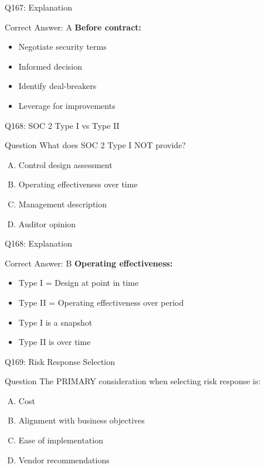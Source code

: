 \documentclass{beamer}
\begin{document}
	\begin{frame}{Q167: Explanation}
		\begin{block}{Correct Answer: A}
			\textbf{Before contract:}
			\begin{itemize}
				\item Negotiate security terms
				\item Informed decision
				\item Identify deal-breakers
				\item Leverage for improvements
			\end{itemize}
		\end{block}
	\end{frame}
	
	\begin{frame}{Q168: SOC 2 Type I vs Type II}
		\begin{block}{Question}
			What does SOC 2 Type I NOT provide?
		\end{block}
		\begin{enumerate}[(A)]
			\item Control design assessment
			\item Operating effectiveness over time
			\item Management description
			\item Auditor opinion
		\end{enumerate}
	\end{frame}
	
	\begin{frame}{Q168: Explanation}
		\begin{block}{Correct Answer: B}
			\textbf{Operating effectiveness:}
			\begin{itemize}
				\item Type I = Design at point in time
				\item Type II = Operating effectiveness over period
				\item Type I is a snapshot
				\item Type II is over time
			\end{itemize}
		\end{block}
	\end{frame}
	
	\begin{frame}{Q169: Risk Response Selection}
		\begin{block}{Question}
			The PRIMARY consideration when selecting risk response is:
		\end{block}
		\begin{enumerate}[(A)]
			\item Cost
			\item Alignment with business objectives
			\item Ease of implementation
			\item Vendor recommendations
		\end{enumerate}
	\end{frame}
	
\end{document}
